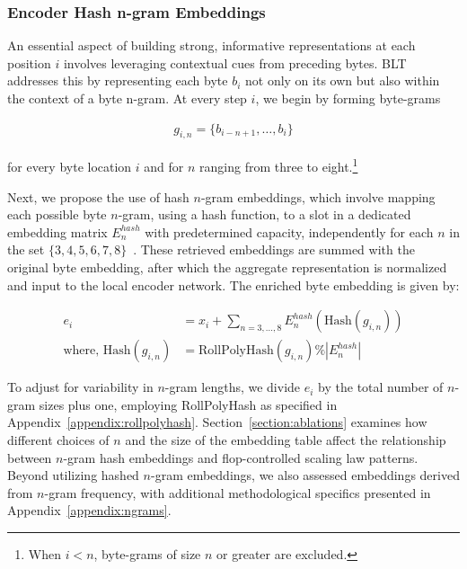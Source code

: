 \subsubsection{Encoder Hash n-gram Embeddings}
\label{sec:ngram-emb}
\label{sec:hash-emb}
An essential aspect of building strong, informative representations at each position $i$ involves leveraging contextual cues from preceding bytes. {\textsc BLT} addresses this by representing each byte $b_i$ not only on its own but also within the context of a byte n-gram. At every step $i$, we begin by forming byte-grams

\begin{align}
    g_{i,n}=\{b_{i-n + 1},\ldots, b_i\}
\end{align}

for every byte location $i$ and for $n$ ranging from three to eight.\footnote{
When $i<n$, byte-grams of size $n$ or greater are excluded. }

Next, we propose the use of hash $n$-gram embeddings, which involve mapping each possible byte $n$-gram, using a hash function, to a slot in a dedicated embedding matrix $E_{n}^{hash}$ with predetermined capacity, independently for each $n$ in the set $\{3,4,5,6,7,8\}$~\citep{bai2010learning}. These retrieved embeddings are summed with the original byte embedding, after which the aggregate representation is normalized and input to the local encoder network. The enriched byte embedding is given by:

\begin{align}
e_i &= x_i + \sum_{n = 3,...,8}E_{n}^{hash}(\text{Hash}(g_{i,n})) \\
\text{where, Hash}(g_{i,n}) &= \text{RollPolyHash}(g_{i,n}) \% |E_{n}^{hash}|
\end{align}

To adjust for variability in $n$-gram lengths, we divide $e_i$ by the total number of $n$-gram sizes plus one, employing RollPolyHash as specified in Appendix~\ref{appendix:rollpolyhash}. Section~\ref{section:ablations} examines how different choices of $n$ and the size of the embedding table affect the relationship between $n$-gram hash embeddings and flop-controlled scaling law patterns. Beyond utilizing hashed $n$-gram embeddings, we also assessed embeddings derived from $n$-gram frequency, with additional methodological specifics presented in Appendix~\ref{appendix:ngrams}.

